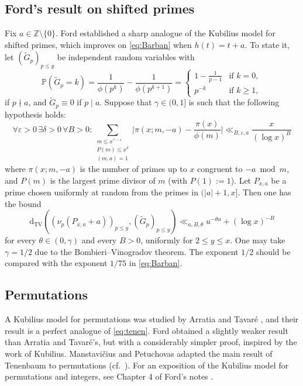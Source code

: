 \documentclass{article}
\theoremstyle{plain}
\theoremstyle{remark}
\newcommand{\PP}{\mathbb{P}}
\newcommand{\ZZ}{\mathbb{Z}}
\newcommand{\dtv}{\mathrm{d}_{\mathrm{TV}}}
\numberwithin{equation}{section}
\begin{document}
\subsection{Ford's result on shifted primes}\label{sec:ford}
Fix $a\in \ZZ\setminus \{0\}$. Ford \cite{FordShifted} established a sharp analogue of the Kubilius model for shifted primes, which improves on \eqref{eq:Barban} when $h(t)=t+a$. To state it, let $(\widetilde{G}_p)_{p \le y}$ be independent random variables with \[\PP(\widetilde{G}_p=k)=\frac{1}{\phi(p^k)}-\frac{1}{\phi(p^{k+1})}=\begin{cases} 1-\frac{1}{p-1} &\text{if }k=0,\\p^{-k}&\text{if }k\ge 1,\end{cases}\]
if $p\nmid a$, and $\widetilde{G}_p\equiv 0$ if $p\mid a$. Suppose that $\gamma\in (0,1]$ is such that the following hypothesis holds:
\begin{equation}\label{eq:Hz}
\forall \varepsilon>0\, \exists \delta>0\, \forall B>0:  \sum_{\substack{m\le x^{\gamma-\varepsilon}\\P(m)\le x^{\delta}\\(m,a)=1}}\bigg|\pi(x;m,-a)-\frac{\pi(x)}{\phi(m)}\bigg| \ll_{B,\varepsilon,a} \frac{x}{(\log x)^B}
\end{equation}
where $\pi(x;m,-a)$ is the number of primes up to $x$ congruent to $-a\bmod m$, and  $P(m)$ is the largest prime divisor of $m$ (with $P(1):=1$). Let $P_{x,a}$ be a prime chosen uniformly at random from the primes in $(|a|+1,x]$. Then one has the bound \cite[Theorem~1]{FordShifted}
\begin{equation}\label{eq:ford}
\dtv( (\nu_p(P_{x,a}+a))_{p\le y},(\widetilde{G}_p)_{p\le y} )\ll_{a,B,\theta} u^{-\theta u} + (\log x)^{-B}
\end{equation}
for every $\theta \in (0,\gamma)$ and  every $B>0$, uniformly for $2\le y \le x$. One may take $\gamma=1/2$ due to the Bombieri--Vinogradov theorem. The exponent $1/2$ should be compared with the exponent $1/75$ in \eqref{eq:Barban}.
\subsection{Permutations}
A Kubilius model for permutations was studied by Arratia and Tavar{\'e} \cite[Theorem 2]{AT}, and their result is a perfect analogue of \eqref{eq:tenen}.  Ford \cite[Theorem 1.19]{Toolkit} obtained a slightly weaker result than Arratia and Tavar{\'e}'s, but with a considerably simpler proof, inspired by the work of Kubilius. Manstavi{\v{c}}ius and Petuchovas 
\cite[Theorem 3]{MP} adapted the main result of Tenenbaum \cite{TenenbaumCrible} to permutations (cf.~\cite{petuchovasthesis}). For an exposition of the Kubilius model for permutations and integers, see Chapter 4 of Ford's notes \cite{FordNotesAnatomy}.
\end{document}
